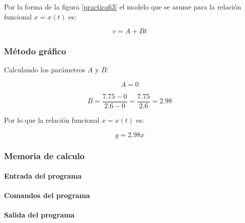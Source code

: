 \documentclass[letter,11pt]{article}
\begin{document}
Por la forma de la figura \ref{practica63} el modelo que se asume para la
relación funcional $x = x(t)$ es:

\begin{equation*}
    v = A + B t
\end{equation*}

\subsubsection{Método gráfico}
Calculando los parámetros $A$ y $B$:

\begin{equation*}
    A = 0
\end{equation*}

\begin{equation*}
    B = \frac{7.75-0}{2.6-0} = \frac{7.75}{2.6} = 2.98
\end{equation*}

Por lo que la relación funcional $x = x(t)$ es:

\begin{equation}
    y = 2.98 x
\end{equation}

\subsubsection{Memoria de calculo}

\paragraph{Entrada del programa}
\begin{alltt}
\footnotesize

\normalsize
\end{alltt}

\paragraph{Comandos del programa}
\begin{alltt}
\footnotesize

\normalsize
\end{alltt}

\paragraph{Salida del programa}
\begin{alltt}
\footnotesize

\normalsize
\end{alltt}
\end{document}
